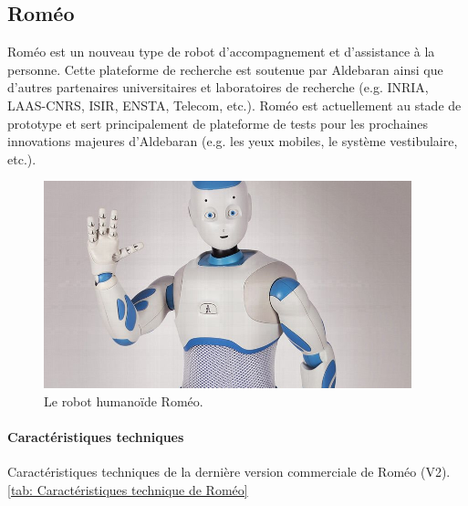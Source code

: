 \subsection{Roméo}
\label{Entreprise: Les produits: Roméo}
Roméo est un nouveau type de robot d'accompagnement et d'assistance à la personne. Cette plateforme de recherche est soutenue par Aldebaran ainsi que d'autres partenaires universitaires et laboratoires de recherche (e.g. INRIA, LAAS-CNRS, ISIR, ENSTA, Telecom, etc.). Roméo est actuellement au stade de prototype et sert principalement de plateforme de tests pour les prochaines innovations majeures d'Aldebaran (e.g. les yeux mobiles, le système vestibulaire, etc.). 

\begin{figure}[h]
	\centering\includegraphics[height=6cm]{images/romeo.jpg}
	\caption{Le robot humanoïde Roméo.}
	\label{fig:Robot humanoïde Roméo}
\end{figure}

\paragraph{Caractéristiques techniques}
Caractéristiques techniques de la dernière version commerciale de Roméo (V2). \ref{tab: Caractéristiques technique de Roméo}

